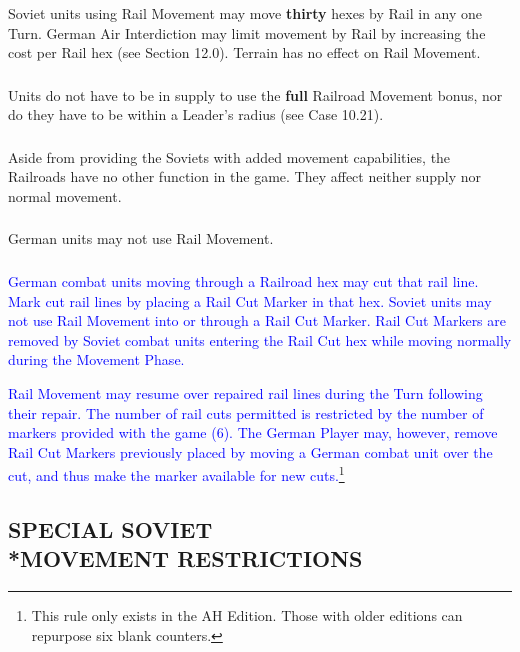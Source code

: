 \subsubsection{} Soviet units using Rail Movement may move \textbf{thirty} hexes by Rail in any one Turn. German Air Interdiction may limit movement by Rail by increasing the cost per Rail hex (see Section 12.0). Terrain has no effect on Rail Movement.

\subsubsection{} Units do not have to be in supply to use the \textbf{full} Railroad Movement bonus, nor do they have to be within a Leader's radius (see Case 10.21).

\subsubsection{} Aside from providing the Soviets with added movement capabilities, the Railroads have no other function in the game. They affect neither supply nor normal movement.

\subsubsection{} German units may not use Rail Movement.
\nobreak
\textcolor{blue}{\subsubsection{} German combat units moving through a Railroad hex may cut that rail line.  Mark cut rail lines by placing a
Rail Cut Marker in that hex. Soviet units may not use Rail Movement into or through a Rail Cut Marker.  Rail Cut Markers are removed by
Soviet combat units entering the Rail Cut hex while moving normally during the Movement Phase.}

\textcolor{blue}{Rail Movement may resume over repaired rail lines during the Turn following their repair.  The number of rail cuts permitted is restricted by the number of markers provided with the game (6).  The German Player may, however, remove Rail Cut Markers previously placed by moving a German combat unit over the cut, and thus make the marker available for new cuts.}\footnote{This rule only exists in the AH Edition. Those with older editions can repurpose six blank counters.}

\subsection{SPECIAL SOVIET\\*MOVEMENT RESTRICTIONS}

